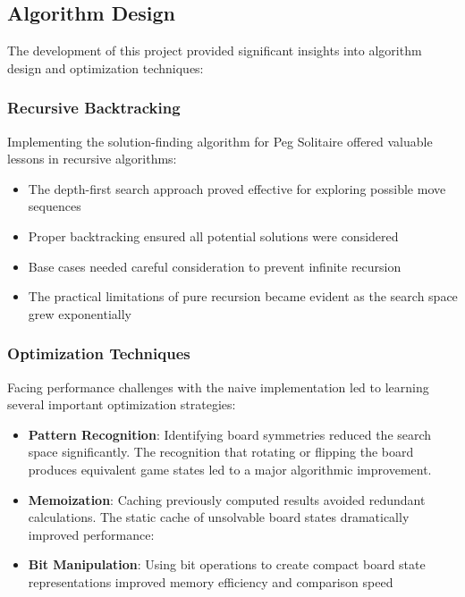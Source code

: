 \subsection{Algorithm Design}
The development of this project provided significant insights into algorithm design and optimization techniques:

\subsubsection{Recursive Backtracking}
Implementing the solution-finding algorithm for Peg Solitaire offered valuable lessons in recursive algorithms:

\begin{itemize}
    \item The depth-first search approach proved effective for exploring possible move sequences
    \item Proper backtracking ensured all potential solutions were considered
    \item Base cases needed careful consideration to prevent infinite recursion
    \item The practical limitations of pure recursion became evident as the search space grew exponentially
\end{itemize}

\subsubsection{Optimization Techniques}
Facing performance challenges with the naive implementation led to learning several important optimization strategies:

\begin{itemize}
    \item \textbf{Pattern Recognition}: Identifying board symmetries reduced the search space significantly. The recognition that rotating or flipping the board produces equivalent game states led to a major algorithmic improvement.
   
    \item \textbf{Memoization}: Caching previously computed results avoided redundant calculations. The static cache of unsolvable board states dramatically improved performance:

    \item \textbf{Bit Manipulation}: Using bit operations to create compact board state representations improved memory efficiency and comparison speed
\end{itemize}

